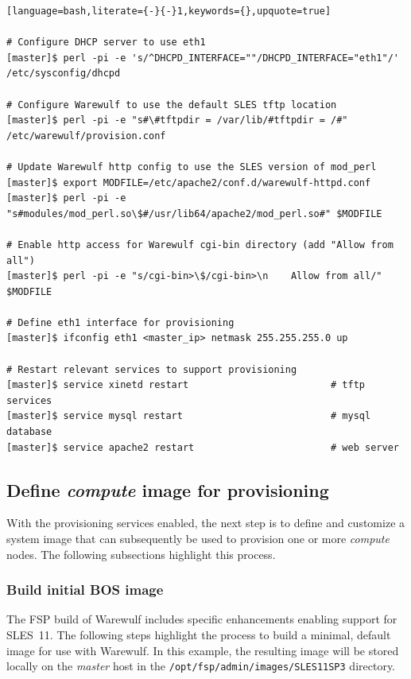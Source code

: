 \documentclass[letterpaper]{article}
\newcommand{\baseOS}{SLES11SP3}
\begin{document}
\begin{lstlisting}[language=bash,literate={-}{-}1,keywords={},upquote=true]

# Configure DHCP server to use eth1
[master]$ perl -pi -e 's/^DHCPD_INTERFACE=""/DHCPD_INTERFACE="eth1"/' /etc/sysconfig/dhcpd

# Configure Warewulf to use the default SLES tftp location
[master]$ perl -pi -e "s#\#tftpdir = /var/lib/#tftpdir = /#" /etc/warewulf/provision.conf

# Update Warewulf http config to use the SLES version of mod_perl
[master]$ export MODFILE=/etc/apache2/conf.d/warewulf-httpd.conf
[master]$ perl -pi -e "s#modules/mod_perl.so\$#/usr/lib64/apache2/mod_perl.so#" $MODFILE

# Enable http access for Warewulf cgi-bin directory (add "Allow from all")
[master]$ perl -pi -e "s/cgi-bin>\$/cgi-bin>\n    Allow from all/" $MODFILE

# Define eth1 interface for provisioning
[master]$ ifconfig eth1 <master_ip> netmask 255.255.255.0 up

# Restart relevant services to support provisioning
[master]$ service xinetd restart                         # tftp services
[master]$ service mysql restart                          # mysql database
[master]$ service apache2 restart                        # web server
\end{lstlisting}

\subsection{Define {\em compute} image for provisioning}

With the provisioning services enabled, the next step is to define and
customize a system image that can subsequently be used to provision one or more
{\em compute} nodes. The following subsections highlight this process.

\subsubsection{Build initial BOS image}

The FSP build of Warewulf includes specific enhancements enabling support for
SLES~11. The following steps highlight the process to build a minimal, default
image for use with Warewulf. In this example, the resulting image will be
stored locally on the {\em master} host in the
\texttt{/opt/fsp/admin/images/\baseOS{}} directory. \\
\end{document}
